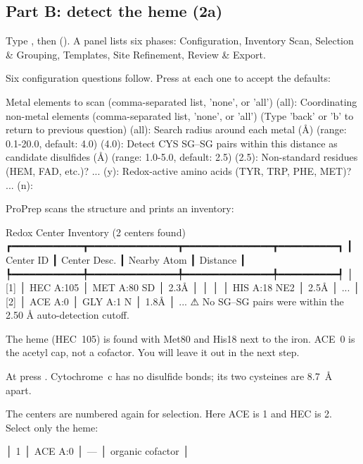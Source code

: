\subsection*{Part B: detect the heme (2a)}

\begin{steps}
  \item Type , then  ().
        A panel lists six phases: Configuration, Inventory Scan, Selection
        \& Grouping, Templates, Site Refinement, Review \& Export.
  \item Six configuration questions follow. Press  at each one to
        accept the defaults:
\begin{screen}
Metal elements to scan (comma-separated list, 'none', or 'all') (all):
Coordinating non-metal elements (comma-separated list, 'none', or 'all')
  (Type 'back' or 'b' to return to previous question) (all):
Search radius around each metal (Å) (range: 0.1-20.0, default: 4.0) (4.0):
Detect CYS SG–SG pairs within this distance as candidate disulfides (Å)
  (range: 1.0-5.0, default: 2.5) (2.5):
Non-standard residues (HEM, FAD, etc.)? ... (y):
Redox-active amino acids (TYR, TRP, PHE, MET)? ... (n):
\end{screen}
  \item ProPrep scans the structure and prints an inventory:
\begin{screen}
       Redox Center Inventory (2 centers found)
┏━━━━━━━━━━━━┳━━━━━━━━━━━━━━━┳━━━━━━━━━━━━━━━┳━━━━━━━━━━┓
┃ Center ID  ┃ Center Desc.  ┃ Nearby Atom   ┃ Distance ┃
┡━━━━━━━━━━━━╇━━━━━━━━━━━━━━━╇━━━━━━━━━━━━━━━╇━━━━━━━━━━┩
│ [1]        │ HEC A:105     │ MET A:80 SD   │ 2.3Å     │
│            │               │ HIS A:18 NE2  │ 2.5Å     │
...
│ [2]        │ ACE A:0       │ GLY A:1 N     │ 1.8Å     │
...
⚠ No SG–SG pairs were within the 2.50 Å auto-detection cutoff.
\end{screen}
        The heme (HEC~105) is found with Met80 and His18 next to the iron.
        ACE~0 is the acetyl cap, not a cofactor. You will leave it out in the
        next step.
  \item At  press . Cytochrome~c has no disulfide
        bonds; its two cysteines are 8.7~\AA{} apart.
  \item The centers are numbered again for selection. Here ACE is 1 and HEC is
        2. Select only the heme:
\begin{screen}
│ 1      │ ACE A:0       │ —        │ organic cofactor          │

\end{screen}
\end{steps}
